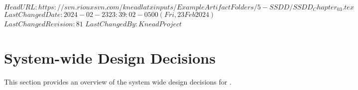 \svnidlong
{$HeadURL: https://svn.riouxsvn.com/kneadlatxinputs/ExampleArtifactFolders/5-SSDD/SSDD_Chapter_03.tex $}
{$LastChangedDate: 2024-02-23 23:39:02 -0500 (Fri, 23 Feb 2024) $}
{$LastChangedRevision: 81 $}
{$LastChangedBy: KneadProject $}


\chapter{System-wide Design Decisions}
\label{loc:SystemWideDesignDecisions}


This section provides an overview of the system wide design decisions for \ThisSys.
